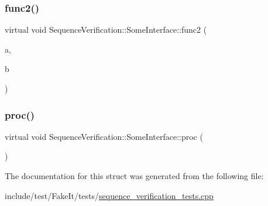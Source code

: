 \subsubsection{\texorpdfstring{func2()}{func2()}}
{\footnotesize\ttfamily virtual void Sequence\+Verification\+::\+Some\+Interface\+::func2 (\begin{DoxyParamCaption}\item[{\mbox{\hyperlink{classSequenceVerification_1_1UserType}{User\+Type}} \&}]{a,  }\item[{int}]{b }\end{DoxyParamCaption})\hspace{0.3cm}{\ttfamily [pure virtual]}}

\mbox{\label{structSequenceVerification_1_1SomeInterface_abb42f58108f4abc5460603b6e6730966}} 
\subsubsection{\texorpdfstring{proc()}{proc()}}
{\footnotesize\ttfamily virtual void Sequence\+Verification\+::\+Some\+Interface\+::proc (\begin{DoxyParamCaption}\item[{int}]{ }\end{DoxyParamCaption})\hspace{0.3cm}{\ttfamily [pure virtual]}}



The documentation for this struct was generated from the following file\+:\begin{DoxyCompactItemize}
\item 
include/test/\+Fake\+It/tests/\mbox{\hyperlink{sequence__verification__tests_8cpp}{sequence\+\_\+verification\+\_\+tests.\+cpp}}\end{DoxyCompactItemize}

